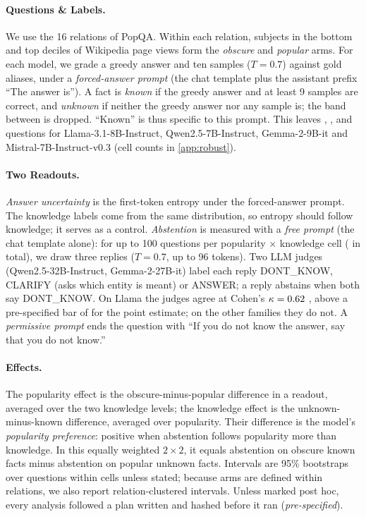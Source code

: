 \documentclass{article}
\begin{document}
\paragraph{Questions \& Labels.} We use the 16 relations of PopQA. Within each relation, subjects in the bottom and top deciles of Wikipedia page views form the \emph{obscure} and \emph{popular} arms. For each model, we grade a greedy answer and ten samples ($T=0.7$) against gold aliases, under a \emph{forced-answer prompt} (the chat template plus the assistant prefix ``The answer is''). A fact is \emph{known} if the greedy answer and at least 9 samples are correct, and \emph{unknown} if neither the greedy answer nor any sample is; the band between is dropped. ``Known'' is thus specific to this prompt. This leaves \faLlamaN, \faQwenN, \faGemmaN{} and \faMistralN{} questions for Llama-3.1-8B-Instruct, Qwen2.5-7B-Instruct, Gemma-2-9B-it and Mistral-7B-Instruct-v0.3 \citep{llama3,qwen25,gemma2,mistral7b} (cell counts in \cref{app:robust}).

\paragraph{Two Readouts.} \emph{Answer uncertainty} is the first-token entropy under the forced-answer prompt. The knowledge labels come from the same distribution, so entropy should follow knowledge; it serves as a control. \emph{Abstention} is measured with a \emph{free prompt} (the chat template alone): for up to 100 questions per popularity $\times$ knowledge cell (\hmLlamaItems{} in total), we draw three replies ($T=0.7$, up to 96 tokens). Two LLM judges (Qwen2.5-32B-Instruct, Gemma-2-27B-it) label each reply DONT\_KNOW, CLARIFY (asks which entity is meant) or ANSWER; a reply abstains when both say DONT\_KNOW. On Llama the judges agree at Cohen's $\kappa=0.62$ \lkKappaCI, above a pre-specified bar of \kappaBar{} for the point estimate; on the other families they do not. A \emph{permissive prompt} ends the question with ``If you do not know the answer, say that you do not know.''

\paragraph{Effects.} The popularity effect is the obscure-minus-popular difference in a readout, averaged over the two knowledge levels; the knowledge effect is the unknown-minus-known difference, averaged over popularity. Their difference is the model's \emph{popularity preference}: positive when abstention follows popularity more than knowledge. In this equally weighted $2\times2$, it equals abstention on obscure known facts minus abstention on popular unknown facts. Intervals are 95\% bootstraps over questions within cells unless stated; because arms are defined within relations, we also report relation-clustered intervals. Unless marked post hoc, every analysis followed a plan written and hashed before it ran (\emph{pre-specified}).
\end{document}
